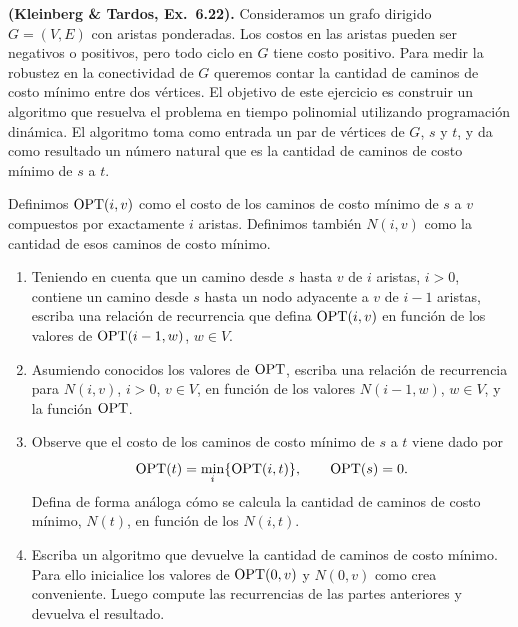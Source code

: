 \begin{enunciado}
\textbf{(Kleinberg \& Tardos, Ex.~6.22).} Consideramos un grafo dirigido $G=(V,E)$ con aristas ponderadas.
Los costos en las aristas pueden ser negativos o positivos, pero todo ciclo en $G$ tiene costo positivo.
Para medir la robustez en la conectividad de $G$ queremos contar la cantidad de caminos de costo mínimo entre
dos vértices. El objetivo de este ejercicio es construir un algoritmo que resuelva el problema en tiempo
polinomial utilizando programación dinámica. El algoritmo toma como entrada un par de vértices de $G$, $s$ y
$t$, y da como resultado un número natural que es la cantidad de caminos de costo mínimo de $s$ a $t$.

Definimos $\mathrm{OPT}(i,v)$ como el costo de los caminos de costo mínimo de $s$ a $v$ compuestos por exactamente
$i$ aristas. Definimos también $N(i,v)$ como la cantidad de esos caminos de costo mínimo.
\begin{enumerate}[label=(\alph*)]
\item Teniendo en cuenta que un camino desde $s$ hasta $v$ de $i$ aristas, $i>0$, contiene un camino desde
  $s$ hasta un nodo adyacente a $v$ de $i-1$ aristas, escriba una relación de recurrencia que defina
  $\mathrm{OPT}(i,v)$ en función de los valores de $\mathrm{OPT}(i-1,w)$, $w\in V$.
\item Asumiendo conocidos los valores de $\mathrm{OPT}$, escriba una relación de recurrencia para $N(i,v)$, $i>0$,
  $v\in V$, en función de los valores $N(i-1,w)$, $w\in V$, y la función $\mathrm{OPT}$.
\item Observe que el costo de los caminos de costo mínimo de $s$ a $t$ viene dado por
  \[ \mathrm{OPT}(t)=\min_i\{\mathrm{OPT}(i,t)\},\qquad \mathrm{OPT}(s)=0. \]
  Defina de forma análoga cómo se calcula la cantidad de caminos de costo mínimo, $N(t)$, en función de los
  $N(i,t)$.
\item Escriba un algoritmo que devuelve la cantidad de caminos de costo mínimo. Para ello inicialice los
  valores de $\mathrm{OPT}(0,v)$ y $N(0,v)$ como crea conveniente. Luego compute las recurrencias de las partes
  anteriores y devuelva el resultado.
\end{enumerate}
\end{enunciado}



